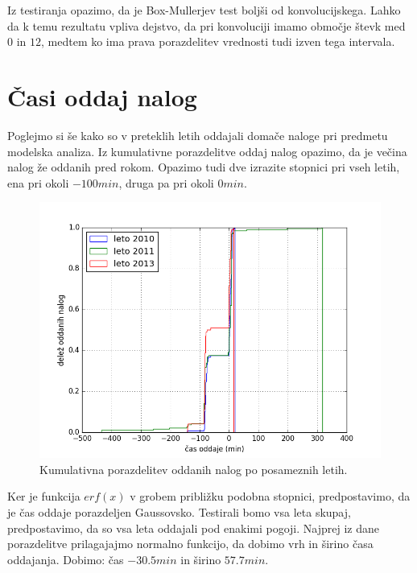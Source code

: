 \documentclass[slovene,11pt,a4paper]{article}
\numberwithin{equation}{section} %
\numberwithin{figure}{section} %
\numberwithin{table}{section} %
\begin{document}
Iz testiranja opazimo, da je Box-Mullerjev test boljši od konvolucijskega. Lahko da k temu rezultatu vpliva dejstvo, da pri konvoluciji imamo območje števk med $0$ in $12$, medtem ko ima prava porazdelitev vrednosti tudi izven tega intervala.




\section{Časi oddaj nalog}



Poglejmo si še kako so v preteklih letih oddajali domače naloge pri predmetu modelska analiza. Iz kumulativne porazdelitve oddaj nalog opazimo, da je večina nalog že oddanih pred rokom. Opazimo tudi dve izrazite stopnici pri vseh letih, ena pri okoli $-100min$, druga pa pri okoli $0min$.

\begin{figure}[h]
\begin{center}
\includegraphics[scale=0.5]{slike/kumulativna_oddaje_nalog_posamezna_leta.png}
\end{center}
\caption{Kumulativna porazdelitev oddanih nalog po posameznih letih. }
\end{figure}

Ker je funkcija $erf(x)$ v grobem približku podobna stopnici, predpostavimo, da je čas oddaje porazdeljen Gaussovsko. Testirali bomo vsa leta skupaj, predpostavimo, da so vsa leta oddajali pod enakimi pogoji. Najprej iz dane porazdelitve prilagajajmo normalno funkcijo, da dobimo vrh in širino časa oddajanja. Dobimo: čas $-30.5min$ in širino $57.7min$.
\end{document}

